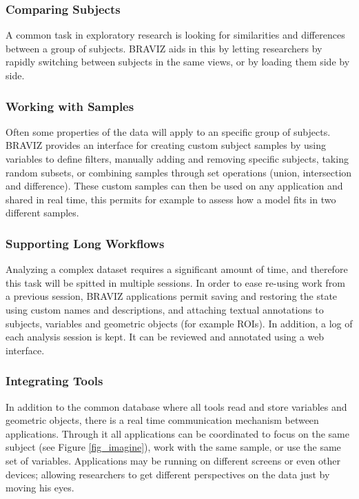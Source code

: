 \documentclass[twocolumn]{svjour3}
\begin{document}
\subsubsection{Comparing Subjects}

A common task in exploratory research is looking for similarities and differences between a group of subjects. BRAVIZ aids in this by letting researchers by rapidly switching between subjects in the same views, or by loading them side by side.

\subsubsection{Working with Samples}

Often some properties of the data will apply to an specific group of subjects. BRAVIZ provides an interface for creating custom subject samples by using variables to define filters, manually adding and removing specific subjects, taking random subsets, or combining samples through set operations (union, intersection and difference).  These custom samples can then be used on any application and shared in real time, this permits for example to assess how a model fits in two different samples.

\subsubsection{Supporting Long Workflows}

Analyzing a complex dataset requires a significant amount of time, and therefore this task will be spitted in multiple sessions. In order to ease re-using work from a previous session, BRAVIZ applications permit saving and restoring the state using custom names and descriptions, and attaching textual annotations to subjects, variables and geometric objects (for example ROIs). In addition, a log of each analysis session is kept. It can be reviewed and annotated using a web interface.

\subsubsection{Integrating Tools}

In addition to the common database where all tools read and store variables and geometric objects, there is a real time communication mechanism between applications. Through it all applications can be coordinated to focus on the same subject (see Figure \ref{fig_imagine}), work with the same sample, or use the same set of variables. Applications may be running on different screens or even other devices; allowing researchers to get different perspectives on the data just by moving his eyes.
\end{document}
